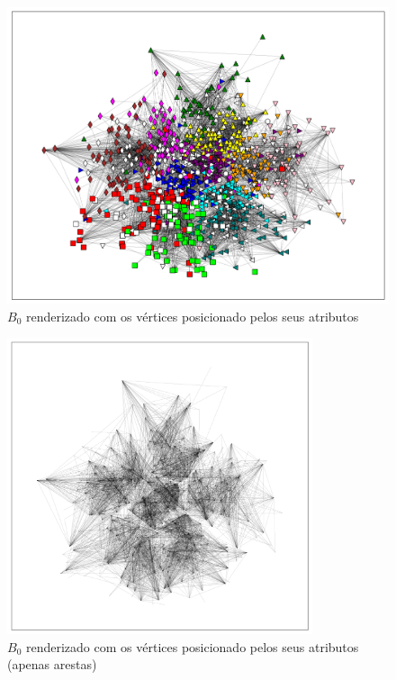 \documentclass[notes.tex]{subfiles}
\begin{document}
\begin{figure}[htpb]
    \centering
    \caption{$B_0$ renderizado com os vértices posicionado pelos seus atributos}\label{fig:b0_pos}
    \includegraphics[width=\textwidth, height=0.52\textheight]{figures/b0_pos.png}
\end{figure}

\begin{figure}[htpb]
    \centering
    \caption{$B_0$ renderizado com os vértices posicionado pelos seus atributos (apenas arestas)}\label{fig:b0_pos_wires}
    \includegraphics[width=0.8\textwidth, height=0.32\textheight]{figures/b0_pos_wires.png}
\end{figure}
\end{document}
